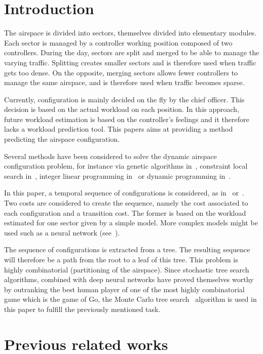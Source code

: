 \documentclass[oneside,twocolumn]{article}
\begin{document}
\section{Introduction}
The airspace is divided into sectors, themselves divided into elementary
modules. Each sector is managed by a controller working position composed of two
controllers.
During the day, sectors are split and merged to be able to
manage the varying traffic. Splitting creates smaller sectors and is therefore
used when traffic gets too dense. On the opposite, merging sectors allows fewer
controllers to manage the same airspace, and is therefore used when traffic
becomes sparse.

Currently, configuration is mainly decided on the fly by the chief officer.
This decision is based on the actual workload on each position. In this
approach, future workload estimation is based on the controller's feelings and
it therefore lacks a workload prediction tool.
This papers aims at providing a method predicting the airspace configuration.

Several methods have been considered to solve the dynamic airspace configuration
problem, for instance via genetic algorithms in~\cite{sergeeva2017dynamic},
constraint local search in~\cite{jagare2013airspace}, integer linear
programming in~\cite{treimuth2016branch} or dynamic programming
in~\cite{bloem2010dynamic}.

In this paper, a temporal sequence of configurations is considered, as
in~\cite{treimuth2016branch} or~\cite{sergeeva2017dynamic}.
Two costs are considered to create the sequence, namely the cost
associated to each configuration and a transition cost. The former is based on
the workload estimated for one sector given by a simple model. More complex
models might be used such as a neural network
(see~\cite{gianazza2010forecasting}).

The sequence of configurations is extracted from a tree. The resulting
sequence will therefore be a path from the root to a leaf of this tree. This
problem is highly combinatorial (partitioning of the airspace). Since stochastic
tree search algorithms, combined with deep neural networks have proved
themselves worthy by outranking the best human player of one of the most highly
combinatorial game which is the game of Go, the Monte Carlo tree
search~\cite{browne2012survey} algorithm is used in this paper to fulfill the
previously mentioned task.



\section{Previous related works}\label{sec:previous_related_works}
\end{document}
